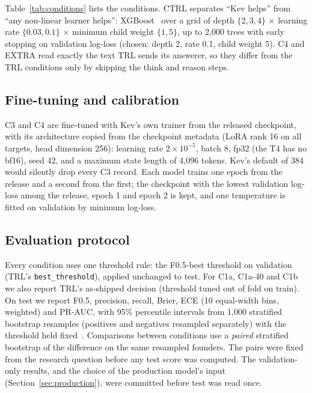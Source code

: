 \documentclass{article}
\newcommand{\cond}[1]{#1}
\begin{document}
Table~\ref{tab:conditions} lists the conditions. \cond{CTRL} separates ``Kev helps'' from ``any
non-linear learner helps'': XGBoost~\citep{chen2016xgboost} over a grid of depth $\{2,3,4\}$
$\times$ learning rate $\{0.03, 0.1\}$ $\times$ minimum child weight $\{1,5\}$, up to 2,000 trees
with early stopping on validation log-loss (chosen: depth 2, rate 0.1, child weight 5).
\cond{C4} and \cond{EXTRA} read exactly the text TRL sends its answerer, so they differ from the
TRL conditions only by skipping the think and reason steps.

\subsection{Fine-tuning and calibration}

\cond{C3} and \cond{C4} are fine-tuned with Kev's own trainer from the released checkpoint, with
its architecture copied from the checkpoint metadata (LoRA rank 16 on all targets, head dimension
256): learning rate $2\times10^{-5}$, batch 8, fp32 (the T4 has no bf16), seed 42, and a maximum
state length of 4,096 tokens. Kev's default of 384 would silently drop every \cond{C3} record.
Each model trains one epoch from the release and a second from the first; the checkpoint with the
lowest validation log-loss among the release, epoch 1 and epoch 2 is kept, and one temperature is
fitted on validation by minimum log-loss.

\subsection{Evaluation protocol}

Every condition uses one threshold rule: the F0.5-best threshold on validation (TRL's
\texttt{best\_threshold}), applied unchanged to test. For \cond{C1a}, \cond{C1a-40} and
\cond{C1b} we also report TRL's as-shipped decision (threshold tuned out of fold on train).
On test we report F0.5, precision, recall, Brier, ECE (10 equal-width bins, weighted) and PR-AUC,
with 95\% percentile intervals from 1,000 stratified bootstrap resamples (positives and negatives
resampled separately) with the threshold held fixed~\citep{efron1993bootstrap}. Comparisons
between conditions use a \emph{paired} stratified bootstrap of the difference on the same
resampled founders. The pairs were fixed from the research question before any test score was
computed. The validation-only results, and the choice of the production model's input
(Section~\ref{sec:production}), were committed before test was read once.
\end{document}
